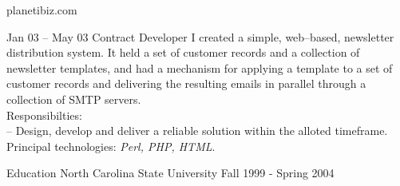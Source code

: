 \documentclass[letterpaper, 11pt]{article}
\begin{document}
\begin{resume}
\begin{block}
\begin{category}{planetibiz.com}
            \end{category}
            \begin{subcategory}{Jan 03 -- May 03}
                 {Contract Developer}
                I created a simple, web--based, newsletter distribution system.
                It held a set of customer records and a collection of newsletter templates,
                and had a mechanism for applying a template to a set of customer records and
                delivering the resulting emails in parallel through a collection of SMTP servers.
                \\[1ex]
                Responsibilties: \\
                -- Design, develop and deliver a reliable solution within the alloted timeframe.
                \\[1ex]
                Principal technologies: \emph{Perl, PHP, HTML}.
                \bigskip
                \bigskip
            \end{subcategory}
        \end{block}
        \begin{block}
            \begin{category}{Education}
                 {North Carolina State University}
                        { }                        {Fall 1999 - Spring 2004}
            \end{category}
        \end{block}
    \end{resume}
\end{document}
